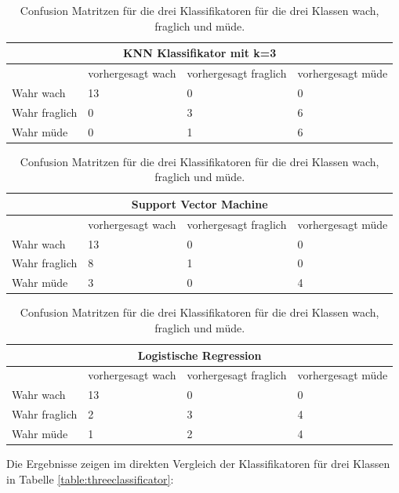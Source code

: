 \begin{table}
    \centering
    \begin{tabular}{|l|l|l|l|}
    \hline
    \multicolumn{4}{|c|}{\textbf{KNN Klassifikator mit k=3}} \\ \hline
    & vorhergesagt wach & vorhergesagt fraglich & vorhergesagt müde \\ \hline
    {Wahr wach} & 13 & 0 & 0 \\ \hline
    {Wahr fraglich} & 0 & 3 & 6 \\ \hline
    {Wahr müde} & 0 & 1 & 6 \\ \hline
    \end{tabular}
    
    \vspace{0.5cm} %
    
    \begin{tabular}{|l|l|l|l|}
    \hline
    \multicolumn{4}{|c|}{\textbf{Support Vector Machine}} \\ \hline
    & vorhergesagt wach & vorhergesagt fraglich & vorhergesagt müde \\ \hline
    {Wahr wach} & 13 & 0 & 0 \\ \hline
    {Wahr fraglich} & 8 & 1 & 0 \\ \hline
    {Wahr müde} & 3 & 0 & 4 \\ \hline
    \end{tabular}
    
    \vspace{0.5cm} %
    
    \begin{tabular}{|l|l|l|l|}
    \hline
    \multicolumn{4}{|c|}{\textbf{Logistische Regression}} \\ \hline
    & vorhergesagt wach & vorhergesagt fraglich & vorhergesagt müde \\ \hline
    {Wahr wach} & 13 & 0 & 0 \\ \hline
    {Wahr fraglich} & 2 & 3 & 4 \\ \hline
    {Wahr müde} & 1 & 2 & 4 \\ \hline
    \end{tabular}

\caption{Confusion Matritzen für die drei Klassifikatoren für die drei Klassen wach, fraglich und müde.}
\label{table:confusionmatrixthreeclasses}
\end{table}

Die Ergebnisse zeigen im direkten Vergleich der Klassifikatoren für drei Klassen in Tabelle \ref{table:threeclassificator}:

